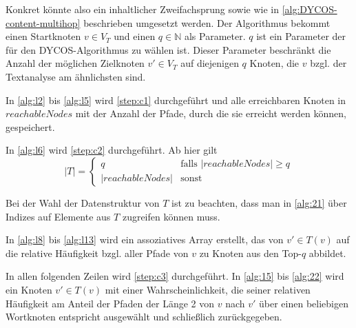 Konkret könnte also ein inhaltlicher Zweifachsprung sowie wie in
\cref{alg:DYCOS-content-multihop} beschrieben umgesetzt werden.
Der Algorithmus bekommt einen Startknoten $v \in V_T$ und
einen $q \in \mathbb{N}$ als Parameter. $q$ ist ein Parameter der
für den DYCOS-Algorithmus zu wählen ist. Dieser Parameter beschränkt 
die Anzahl der möglichen Zielknoten $v' \in V_T$ auf diejenigen
$q$ Knoten, die $v$ bzgl. der Textanalyse am ähnlichsten sind.

In \cref{alg:l2} bis \cref{alg:l5} wird \cref{step:c1} durchgeführt
und alle erreichbaren Knoten in $reachableNodes$ mit der Anzahl
der Pfade, durch die sie erreicht werden können, gespeichert.

In \cref{alg:l6} wird \cref{step:c2} durchgeführt. 
Ab hier gilt
\[ |T| = \begin{cases}q               &\text{falls } |reachableNodes|\geq q\\
                     |reachableNodes| &\text{sonst }\end{cases}\]

Bei der Wahl der Datenstruktur von $T$ ist zu beachten, dass man in
\cref{alg:21} über Indizes auf Elemente aus $T$ zugreifen können muss.

In \cref{alg:l8} bis \ref{alg:l13} wird ein assoziatives Array erstellt,
das von $v' \in T(v)$ auf die relative
Häufigkeit bzgl. aller Pfade von $v$ zu Knoten aus den Top-$q$ abbildet.

In allen folgenden Zeilen wird \cref{step:c3} durchgeführt. 
In \cref{alg:15} bis \cref{alg:22} wird ein Knoten $v' \in T(v)$ mit
einer Wahrscheinlichkeit, die seiner relativen Häufigkeit am Anteil
der Pfaden der Länge 2 von $v$ nach $v'$ über einen beliebigen 
Wortknoten entspricht ausgewählt und schließlich zurückgegeben.


